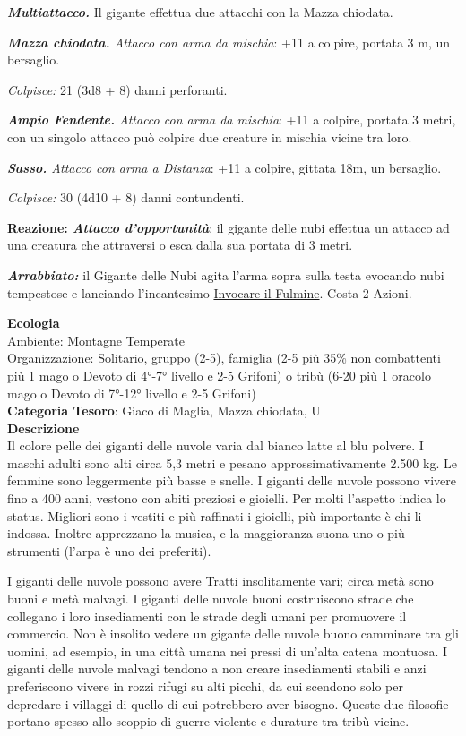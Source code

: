 \begin{multicols}{2}
{\emph{\textbf{Multiattacco.}} Il gigante effettua due attacchi con la Mazza chiodata.

\emph{\textbf{Mazza chiodata.} Attacco con arma da mischia}: +11 a colpire, portata 3 m, un bersaglio.

\emph{Colpisce:} 21 (3d8 + 8) danni perforanti.

\emph{\textbf{Ampio Fendente.} Attacco con arma da mischia}: +11 a colpire, portata 3 metri, con un singolo attacco può colpire due creature in mischia vicine tra loro.

\emph{\textbf{Sasso.} Attacco con arma a Distanza}: +11 a colpire, gittata 18m, un bersaglio.

\emph{Colpisce:} 30 (4d10 + 8) danni contundenti.

\textbf{Reazione: \emph{Attacco d'opportunità}}: il gigante delle nubi effettua un attacco ad una creatura che attraversi o esca dalla sua portata di 3 metri.

\emph{\textbf{Arrabbiato:}} il Gigante delle Nubi agita l'arma sopra sulla testa evocando nubi tempestose e lanciando l'incantesimo \hyperlink{Invocare il Fulmine}{Invocare il Fulmine}. Costa 2 Azioni.

\textbf{Ecologia}\\
Ambiente: Montagne Temperate\\
Organizzazione: Solitario, gruppo (2-5), famiglia (2-5 più 35\% non combattenti più 1 mago o Devoto di 4°-7° livello e 2-5 Grifoni) o tribù (6-20 più 1 oracolo mago o Devoto di 7°-12° livello e 2-5 Grifoni)\\
\textbf{Categoria Tesoro}: Giaco di Maglia, Mazza chiodata, U\\
\textbf{Descrizione}\\
Il colore pelle dei giganti delle nuvole varia dal bianco latte al blu polvere. I maschi adulti sono alti circa 5,3 metri e pesano approssimativamente 2.500 kg. Le femmine sono leggermente più basse e snelle. I giganti delle nuvole possono vivere fino a 400 anni, vestono con abiti preziosi e gioielli. Per molti l'aspetto indica lo status. Migliori sono i vestiti e più raffinati i gioielli, più importante è chi li indossa. Inoltre apprezzano la musica, e la maggioranza suona uno o più strumenti (l'arpa è uno dei preferiti).

I giganti delle nuvole possono avere Tratti insolitamente vari; circa metà sono buoni e metà malvagi. I giganti delle nuvole buoni costruiscono strade che collegano i loro insediamenti con le strade degli umani per promuovere il commercio. Non è insolito vedere un gigante delle nuvole buono camminare tra gli uomini, ad esempio, in una città umana nei pressi di un'alta catena montuosa. I giganti delle nuvole malvagi tendono a non creare insediamenti stabili e anzi preferiscono vivere in rozzi rifugi su alti picchi, da cui scendono solo per depredare i villaggi di quello di cui potrebbero aver bisogno. Queste due filosofie portano spesso allo scoppio di guerre violente e durature tra tribù vicine.

}
\end{multicols}
